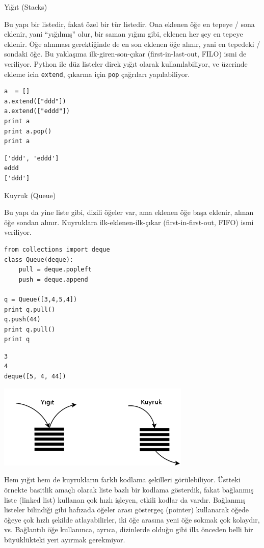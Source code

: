 \documentclass[12pt,fleqn]{article}\usepackage{../../common}
\begin{document}
Yığıt (Stacks)

Bu yapı bir listedir, fakat özel bir tür listedir. Ona eklenen öğe en
tepeye / sona eklenir, yani ``yığılmış'' olur, bir saman yığını gibi,
eklenen her şey en tepeye eklenir. Öğe alınması gerektiğinde de en son
eklenen öğe alınır, yani en tepedeki / sondaki öğe. Bu yaklaşıma
ilk-giren-son-çıkar (first-in-last-out, FILO) ismi de veriliyor. Python ile
düz listeler direk yığıt olarak kullanılabiliyor, ve üzerinde ekleme icin
\verb!extend!, çıkarma için \verb!pop! çağrıları yapılabiliyor. 

\begin{verbatim}
a  = []
a.extend(["ddd"])
a.extend(["eddd"])
print a
print a.pop()
print a
\end{verbatim}

\begin{verbatim}
['ddd', 'eddd']
eddd
['ddd']
\end{verbatim}

Kuyruk (Queue)

Bu yapı da yine liste gibi, dizili öğeler var, ama eklenen öğe başa
eklenir, alınan öğe sondan alınır. Kuyruklara ilk-eklenen-ilk-çıkar
(first-in-first-out, FIFO) ismi veriliyor.

\begin{verbatim}
from collections import deque
class Queue(deque):
    pull = deque.popleft
    push = deque.append

q = Queue([3,4,5,4])
print q.pull()
q.push(44)
print q.pull()
print q
\end{verbatim}

\begin{verbatim}
3
4
deque([5, 4, 44])
\end{verbatim}

\includegraphics[height=4cm]{basic_01.png}

Hem yığıt hem de kuyrukların farklı kodlama şekilleri görülebiliyor.
Üstteki örnekte basitlik amaçlı olarak liste bazlı bir kodlama gösterdik,
fakat bağlanmış liste (linked list) kullanan çok hızlı işleyen, etkili
kodlar da vardır. Bağlanmış listeler bilindiği gibi hafızada öğeler arası
göstergeç (pointer) kullanarak öğede öğeye çok hızlı şekilde
atlayabilirler, iki öğe arasına yeni öğe sokmak çok kolaydır,
vs. Bağlantılı öğe kullanınca, ayrıca, dizinlerde olduğu gibi illa önceden
belli bir büyüklükteki yeri ayırmak gerekmiyor.
\end{document}
